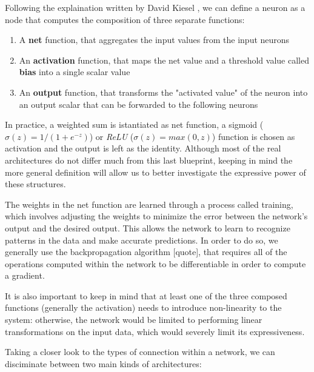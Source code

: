 \documentclass{article}
\begin{document}
Following the explaination written by David Kiesel \cite{KRI07}, we can define a neuron as a node that computes the composition of three separate functions:

\begin{enumerate}
    \item A \textbf{net} function, that aggregates the input values from the input neurons
    \item An \textbf{activation} function, that maps the net value and a threshold value called \textbf{bias} into a single scalar value
    \item An \textbf{output} function, that transforms the "activated value" of the neuron into an output scalar that can be forwarded to the following neurons
\end{enumerate}

In practice, a weighted sum is istantiated as net function, a sigmoid ($\sigma(z)=1/(1+e^{-z})$) or \textit{ReLU} ($\sigma(z) = max(0,z)$) function is chosen as activation and the output is left as the identity. Although most of the real architectures do not differ much from this last blueprint, keeping in mind the more general definition will allow us to better investigate the expressive power of these structures.

The weights in the net function are learned through a process called training, which involves adjusting the weights to minimize the error between the network's output and the desired output. This allows the network to learn to recognize patterns in the data and make accurate predictions. In order to do so, we generally use the backpropagation algorithm [quote], that requires all of the operations computed within the network to be differentiable in order to compute a gradient.

It is also important to keep in mind that at least one of the three composed functions (generally the activation) needs to introduce non-linearity to the system: otherwise, the network would be limited to performing linear transformations on the input data, which would severely limit its expressiveness.

Taking a closer look to the types of connection within a network, we can disciminate between two main kinds of architectures:
\end{document}
